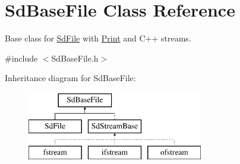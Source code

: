 \hypertarget{class_sd_base_file}{\section{Sd\-Base\-File Class Reference}
\label{class_sd_base_file}
}


Base class for \hyperlink{class_sd_file}{Sd\-File} with \hyperlink{class_print}{Print} and C++ streams.  




{\ttfamily \#include $<$Sd\-Base\-File.\-h$>$}

Inheritance diagram for Sd\-Base\-File\-:\begin{figure}[H]
\begin{center}
\leavevmode
\includegraphics[height=3.000000cm]{class_sd_base_file}
\end{center}
\end{figure}
